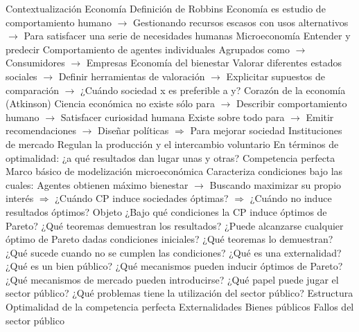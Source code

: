\documentclass{nuevotema}
\begin{document}
\esquemalargo













\begin{esquemal}
	\1[] 
		\2 Contextualización
			\3 Economía
				\4 Definición de Robbins
				\4[] Economía es estudio de comportamiento humano
				\4[] $\to$ Gestionando recursos escasos con usos alternativos
				\4[] $\to$ Para satisfacer una serie de necesidades humanas
				\4 Microeconomía
				\4[] Entender y predecir
				\4[] Comportamiento de agentes individuales
				\4[] Agrupados como
				\4[] $\to$ Consumidores
				\4[] $\to$ Empresas
			\3 Economía del bienestar
				\4 Valorar diferentes estados sociales
				\4[] $\to$ Definir herramientas de valoración
				\4[] $\to$ Explicitar supuestos de comparación
				\4[] $\to$ ¿Cuándo sociedad x es preferible a y?
				\4 Corazón de la economía (Atkinson)
				\4[] Ciencia económica no existe sólo para
				\4[] $\to$ Describir comportamiento humano
				\4[] $\to$ Satisfacer curiosidad humana
				\4[] Existe sobre todo para
				\4[] $\to$ Emitir recomendaciones
				\4[] $\to$ Diseñar políticas
				\4[] $\Rightarrow$ Para mejorar sociedad
			\3 Instituciones de mercado
				\4 Regulan la producción y el intercambio voluntario
				\4 En términos de optimalidad:
				\4[] ¿a qué resultados dan lugar unas y otras?
			\3 Competencia perfecta
				\4 Marco básico de modelización microeconómica
				\4[] Caracteriza condiciones bajo las cuales:
				\4[] Agentes obtienen máximo bienestar
				\4[] $\to$ Buscando maximizar su propio interés
				\4[] $\Rightarrow$ ¿Cuándo CP induce sociedades óptimas?
				\4[] $\Rightarrow$ ¿Cuándo no induce resultados óptimos?
		\2 Objeto
			\3 ¿Bajo qué condiciones la CP induce óptimos de Pareto?
				\4 ¿Qué teoremas demuestran los resultados?
			\3 ¿Puede alcanzarse cualquier óptimo de Pareto dadas condiciones iniciales?
				\4 ¿Qué teoremas lo demuestran?
			\3 ¿Qué sucede cuando no se cumplen las condiciones?
				\4 ¿Qué es una externalidad?
				\4 ¿Qué es un bien público?
			\3 ¿Qué mecanismos pueden inducir óptimos de Pareto?
				\4 ¿Qué mecanismos de mercado pueden introducirse?
				\4 ¿Qué papel puede jugar el sector público?
				\4 ¿Qué problemas tiene la utilización del sector público?
		\2 Estructura
			\3 Optimalidad de la competencia perfecta
			\3 Externalidades
			\3 Bienes públicos
			\3 Fallos del sector público

\end{esquemal}
\end{document}
